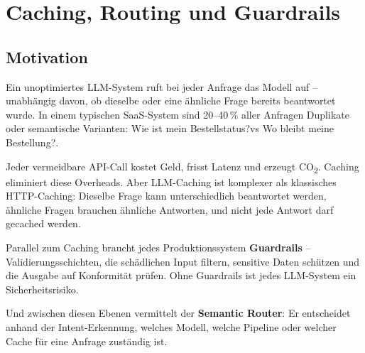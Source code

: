 \chapter{Caching, Routing und Guardrails}
\label{chap:caching}


\section{Motivation}

Ein unoptimiertes LLM-System ruft bei jeder Anfrage das Modell auf -- unabhängig davon, ob dieselbe oder eine ähnliche Frage bereits beantwortet wurde. In einem typischen SaaS-System sind 20--40\,\% aller Anfragen Duplikate oder semantische Varianten: \glqq Wie ist mein Bestellstatus?\grqq vs \glqq Wo bleibt meine Bestellung?\grqq.

Jeder vermeidbare API-Call kostet Geld, frisst Latenz und erzeugt CO\textsubscript{2}. Caching eliminiert diese Overheads. Aber LLM-Caching ist komplexer als klassisches HTTP-Caching: Dieselbe Frage kann unterschiedlich beantwortet werden, ähnliche Fragen brauchen ähnliche Antworten, und nicht jede Antwort darf gecached werden.

Parallel zum Caching braucht jedes Produktionssystem \textbf{Guardrails} -- Validierungsschichten, die schädlichen Input filtern, sensitive Daten schützen und die Ausgabe auf Konformität prüfen. Ohne Guardrails ist jedes LLM-System ein Sicherheitsrisiko.

Und zwischen diesen Ebenen vermittelt der \textbf{Semantic Router}: Er entscheidet anhand der Intent-Erkennung, welches Modell, welche Pipeline oder welcher Cache für eine Anfrage zuständig ist.

